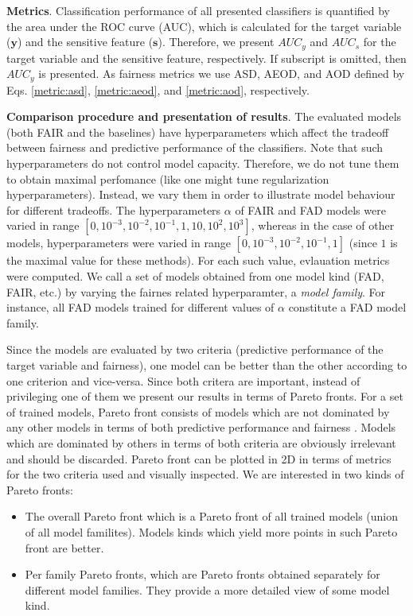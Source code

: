 \documentclass[preprint,12pt]{elsarticle}
\begin{document}
\textbf{Metrics}.
Classification performance of all presented classifiers is quantified by the area under the ROC curve (AUC), which is calculated for the target variable ($\mathbf{y}$) and the sensitive feature ($\mathbf{s}$). Therefore, we present $AUC_y$ and $AUC_s$ for the target variable and the sensitive feature, respectively. If subscript is omitted, then $AUC_y$ is presented. As fairness metrics we use ASD, AEOD, and AOD defined by Eqs. \ref{metric:asd}, \ref{metric:aeod}, and \ref{metric:aod}, respectively.

\textbf{Comparison procedure and presentation of results}. The evaluated models (both FAIR and the baselines) have hyperparameters which affect the tradeoff between fairness and predictive performance of the classifiers. Note that such hyperparameters do not control model capacity. Therefore, we do not tune them to obtain maximal perfomance (like one might tune regularization hyperparameters). Instead, we vary them in order to illustrate model behaviour for different tradeoffs. The hyperparameters $\alpha$ of FAIR and FAD models were varied in range $[0, 10^{-3}, 10^{-2}, 10^{-1}, 1, 10, 10^{2}, 10^{3}]$, whereas in the case of other models, hyperparameters were varied in range $[0, 10^{-3}, 10^{-2}, 10^{-1}, 1]$ (since $1$ is the maximal value for these methods). For each such value, evlauation metrics were computed. We call a set of models obtained from one model kind (FAD, FAIR, etc.) by varying the fairnes related hyperparamter, a {\em model family}. For instance, all FAD models trained for different values of $\alpha$ constitute a FAD model family.

Since the models are evaluated by two criteria (predictive performance of the target variable and fairness), one model can be better than the other according to one criterion and vice-versa. Since both critera are important, instead of privileging one of them we present our results in terms of Pareto fronts. For a set of trained models, Pareto front consists of models which are not dominated by any other models in terms of both predictive performance and fairness \cite{marler2004survey}. Models which are dominated by others in terms of both criteria are obviously irrelevant and should be discarded. Pareto front can be plotted in 2D in terms of metrics for the two criteria used and visually inspected. We are interested in two
kinds of Pareto fronts:
\begin{itemize}
\item The overall Pareto front which is a Pareto front of all trained models (union of all model familites). Models kinds which yield more points in such Pareto front are better.
\item Per family Pareto fronts, which are Pareto fronts obtained separately for different model families. They provide a more detailed view of some model kind.
\end{itemize}
\end{document}
